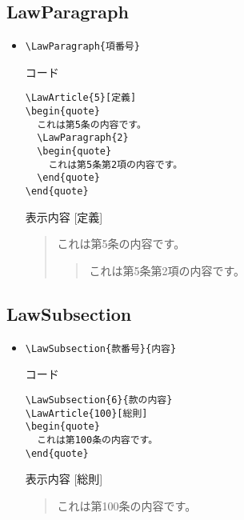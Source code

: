 \documentclass[oneside,10pt,a4paper]{jsarticle}
\begin{document}
  \newpage

  \subsection{LawParagraph}

  \begin{itemize}
    \item \verb|\LawParagraph{項番号}|
      \begin{itembox}[l]{コード}
        {\footnotesize\begin{verbatim}
\LawArticle{5}[定義]
\begin{quote}
  これは第5条の内容です。
  \LawParagraph{2}
  \begin{quote}
    これは第5条第2項の内容です。
  \end{quote}
\end{quote}\end{verbatim}}
      \end{itembox}
      \begin{itembox}[l]{表示内容}
        [定義]
        \begin{quote}
          これは第5条の内容です。
          \begin{quote}
            これは第5条第2項の内容です。
          \end{quote}
        \end{quote}
      \end{itembox}
  \end{itemize}

  \subsection{LawSubsection}

  \begin{itemize}
    \item \verb|\LawSubsection{款番号}{内容}|
      \begin{itembox}[l]{コード}
        {\footnotesize\begin{verbatim}
\LawSubsection{6}{款の内容}
\LawArticle{100}[総則]
\begin{quote}
  これは第100条の内容です。
\end{quote}\end{verbatim}}
      \end{itembox}
      \begin{itembox}[l]{表示内容}
        [総則]
        \begin{quote}
          これは第100条の内容です。
        \end{quote}
      \end{itembox}
  \end{itemize}
\end{document}
